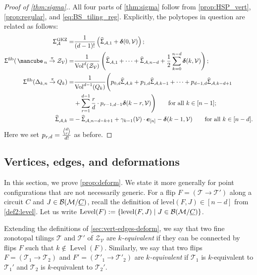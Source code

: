 \documentclass[11pt]{amsart}
\theoremstyle{plain}
\theoremstyle{definition}
\def\A{\mathcal{A}}
\def\V{\mathcal{V}}
\def\ddelta{\bm{\delta}}
\def\Zon{\mathcal{Z}}
\def\ZV{\Zon_\V}
\def\cube{\mbox{\,\mancube\,}}
\def\Vol{\mathrm{Vol}}
\def\level{\mathrm{level}}
\def\Level{\operatorname{Level}}
\def\GKZ{{\operatorname{GKZ}}}
\def\HSP{\widehat\Upsigma}
\def\Sigma{\HSP}
\def\fiber{{\operatorname{fib}}}
\def\FibPoly{\Upsigma^\fiber}
\def\SigmaGKZ{\Upsigma_\A^{\GKZ}}
\def\pito{\overset \pi \to}
\def\VC{\V}
\def\Tcal{\mathcal{T}}
\def\Tiling{\Tcal}
\def\Voldd{\Vol^{d-1}}
\def\Vold{\Vol^d}
\newcommand{\Euli}{\genfrac{\langle}{\rangle}{0pt}{}}
\def\Eul(#1,#2){\Euli{#1}{#2}}
\begin{document}
\begin{proof}[Proof of \cref{thm:sigma}.]
All four parts of \cref{thm:sigma} follow from \cref{prop:HSP_vert}, \cref{prop:regular},  and \eqref{eq:BS_tiling_reg}.  
 Explicitly,  the polytopes in question are related as follows:
\begin{equation}\label{eq:proof}
\begin{aligned}
  \SigmaGKZ=& \frac1{(d-1)!} \left(\Sigma_{\A,1}+ \ddelta(0,\VC)\right);\\
  \FibPoly(\cube_n\pito \Zon_\VC)=&\frac1{\Vold(\ZV)} \left( \Sigma_{\A,1} + \cdots + \Sigma_{\A,n-d} +\frac12\sum_{k=0}^{n-d}\ddelta(k,\VC) \right);\\
  \FibPoly(\Delta_{k,n}\pito Q_k)=&\frac1{\Voldd(Q_k)} \Biggl( p_{0,d}\Sigma_{\A,k}+p_{1,d}\Sigma_{\A,k-1}+ \dots + p_{d-1,d}\Sigma_{\A,k-d+1} \Biggr.\\
&+\Biggl.\sum_{r=1}^{d-1}\frac{r}{d} \cdot p_{r-1,d-1}\ddelta(k-r,\VC) \Biggr)\qquad \text{for all $k\in[n-1]$};\\
 \Sigma_{\A,k}=&-\Sigma_{\A,n-d-k+1}+\gamma_{k-1}(\VC)\cdot \one_n-\ddelta(k-1,\VC)\qquad \text{for all $k\in[n-d]$}.
\end{aligned}
\end{equation}
\noindent Here we set $p_{r,d}=\frac{\Eul(d,r)}{d!}$ as before.
\end{proof}

\subsection{Vertices, edges, and deformations}
\label{sec2:vert-edges-deform}
In this section, we prove \cref{prop:deform}. We state it more generally for 
point configurations
that are not necessarily generic. 
For a flip $F=(\Tiling\to\Tiling')$ along a circuit $C$ and $J\in \mathcal{B}(\mathcal{M}/{\underline{C}})$, recall the definition of $\level(F,J)\in[n-d]$ 
from \cref{def2:level}.
Let us write $\Level(F):=\{\level(F,J)\mid J\in \BMC\}$.

Extending the definitions of \cref{sec:vert-edges-deform}, we say that two fine zonotopal tilings $\Tiling$ and $\Tiling'$ of $\ZV$ are \emph{$k$-equivalent} if they can be connected by flips $F$ such that $k\notin \Level(F)$. Similarly, we say that two flips $F=(\Tiling_1\to\Tiling_2)$ and $F'=(\Tiling'_1\to\Tiling'_2)$ are \emph{$k$-equivalent} if $\Tiling_1$ is $k$-equivalent to $\Tiling_1'$ and $\Tiling_2$ is $k$-equivalent to $\Tiling_2'$.
\end{document}
